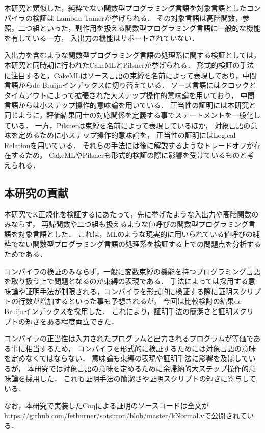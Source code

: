 \documentclass[T]{compsoft}
\begin{document}
本研究と類似した，純粋でない関数型プログラミング言語を対象言語としたコンパイラの検証は
Lambda Tamer\cite{ImpurePOPL10}が挙げられる．
その対象言語は高階関数，参照，二つ組といった，副作用を扱える関数型プログラミング言語に一般的な機能を有している一方，
入出力の機能はサポートされていない．

入出力を含むような関数型プログラミング言語の処理系に関する検証としては，
本研究と同時期に行われたCakeML\cite{CakeML:ICFP16}とPilsner\cite{DBLP:conf/icfp/NeisHKMDV15}が挙げられる．
形式的検証の手法に注目すると，CakeMLはソース言語の束縛を名前によって表現しており，中間言語からde Bruijnインデックスに切り替えている．
ソース言語にはクロックとタイムアウトによって拡張された大ステップ操作的意味論を用いており，
中間言語からは小ステップ操作的意味論を用いている．
正当性の証明には本研究と同じように，評価結果同士の対応関係を定義する事でステートメントを一般化している．
一方，Pilsnerは束縛を名前によって表現しているほか，
対象言語の意味を定めるために小ステップ操作的意味論を，
正当性の証明にはLogical Relationを用いている．
それらの手法には後に解説するようなトレードオフが存在するため，
CakeMLやPilsnerも形式的検証の際に影響を受けているものと考えられる．

\subsection{本研究の貢献}
本研究でK正規化を検証するにあたって，先に挙げたような入出力や高階関数のみならず，
再帰関数や二つ組も扱えるような値呼びの関数型プログラミング言語を対象言語とした．
これは，MLのような現実的に用いられている値呼びの純粋でない関数型プログラミング言語の処理系を検証する上での問題点を分析するためである．

コンパイラの検証のみならず，一般に変数束縛の機能を持つプログラミング言語を取り扱う上で問題となるのが束縛の表現である．
手法によっては採用する意味論や証明手法が制限される，コンパイラを形式的に検証する際に証明スクリプトの行数が増加するといった事も予想されるが，
今回は比較検討の結果de Bruijnインデックスを採用した．
これにより，証明手法の簡潔さと証明スクリプトの短さをある程度両立できた．

コンパイラの正当性は入力されたプログラムと出力されるプログラムが等価である事に相当するため，
コンパイラを形式的に検証するためには対象言語の意味を定めなくてはならない．
意味論も束縛の表現や証明手法に影響を及ぼしているが，
本研究では対象言語の意味を定めるために余帰納的大ステップ操作的意味論を採用した．
これも証明手法の簡潔さや証明スクリプトの短さに寄与している．

なお，本研究で実装したCoqによる証明のソースコードは全文が\url{https://github.com/fetburner/sotsuron/blob/master/kNormal.v}で公開されている．
\end{document}
